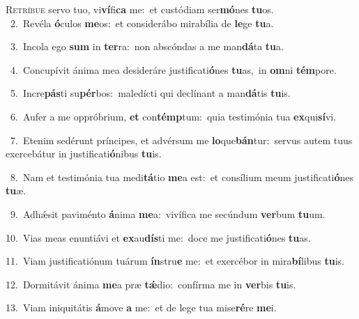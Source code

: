 \lettrine{\initial\textcolor{\initialcolor}{R}}{etríbue} servo tuo, vi\-\textbf{ví}\-fi\textbf{ca} me:~\star et custódiam ser\-\textbf{mó}\-nes \textbf{tu}\-os.\\
{\numbfont\textcolor{\numbcolor}{~2.}}~Revéla \textbf{ó}\-culos \textbf{me}\-os:~\star et considerábo mirabília de \textbf{le}\-ge \textbf{tu}\-a.\par
{\numbfont\textcolor{\numbcolor}{~3.}}~Incola ego \textbf{sum} in \textbf{ter}\-ra:~\star non abscóndas a me man\-\textbf{dá}\-ta \textbf{tu}\-a.\par
{\numbfont\textcolor{\numbcolor}{~4.}}~Concupívit ánima mea desideráre justificati\-\textbf{ó}\-nes \textbf{tu}\-as,~\star in \textbf{om}\-ni \textbf{tém}\-pore.\par
{\numbfont\textcolor{\numbcolor}{~5.}}~Incre\-\textbf{pás}\-ti su\-\textbf{pér}\-bos:~\star maledícti qui declínant a man\-\textbf{dá}\-tis \textbf{tu}\-is.\par
{\numbfont\textcolor{\numbcolor}{~6.}}~Aufer a me oppróbrium, \textbf{et} con\-\textbf{témp}\-tum:~\star quia testimónia tua \textbf{ex}\-qui\-\textbf{sí}\-vi.\par
{\numbfont\textcolor{\numbcolor}{~7.}}~Etenim sedérunt príncipes, et advérsum me \textbf{lo}\-que\-\textbf{bán}\-tur:~\star servus autem tuus exercebátur in justificati\-\textbf{ó}\-nibus \textbf{tu}\-is.\par
{\numbfont\textcolor{\numbcolor}{~8.}}~Nam et testimónia tua medi\-\textbf{tá}\-tio \textbf{me}\-a est:~\star et consílium meum justificati\-\textbf{ó}\-nes \textbf{tu}\-æ.\par
{\numbfont\textcolor{\numbcolor}{~9.}}~Adhǽsit paviménto \textbf{á}\-nima \textbf{me}\-a:~\star vivífica me secúndum \textbf{ver}\-bum \textbf{tu}\-um.\par
{\numbfont\textcolor{\numbcolor}{10.}}~Vias meas enuntiávi et \textbf{ex}\-au\-\textbf{dís}\-ti me:~\star doce me justificati\-\textbf{ó}\-nes \textbf{tu}\-as.\par
{\numbfont\textcolor{\numbcolor}{11.}}~Viam justificatiónum tuárum \textbf{ín}\-stru\textbf{e} me:~\star et exercébor in mira\-\textbf{bí}\-libus \textbf{tu}\-is.\par
{\numbfont\textcolor{\numbcolor}{12.}}~Dormitávit ánima \textbf{me}\-a præ \textbf{tǽ}\-dio:~\star confírma me in \textbf{ver}\-bis \textbf{tu}\-is.\par
{\numbfont\textcolor{\numbcolor}{13.}}~Viam iniquitátis \textbf{á}\-move \textbf{a} me:~\star et de lege tua mise\-\textbf{ré}\-re \textbf{me}\-i.\par
